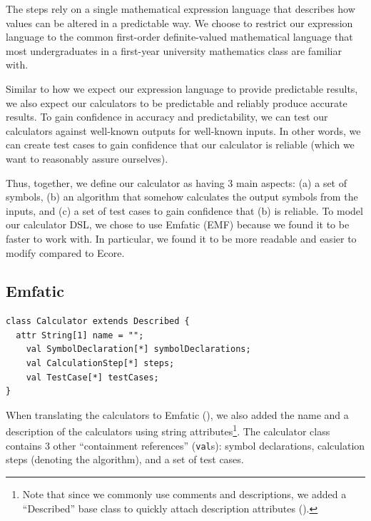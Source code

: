 \documentclass[11pt,fleqn]{article}
\begin{document}
The steps rely on a single mathematical expression language that describes how
values can be altered in a predictable way. We choose to restrict our expression
language to the common first-order definite-valued mathematical language that
most undergraduates in a first-year university mathematics class are familiar
with.

Similar to how we expect our expression language to provide predictable results,
we also expect our calculators to be predictable and reliably produce accurate
results. To gain confidence in accuracy and predictability, we can test our
calculators against well-known outputs for well-known inputs. In other words, we
can create test cases to gain confidence that our calculator is reliable (which
we want to reasonably assure ourselves).

Thus, together, we define our calculator as having 3 main aspects: (a) a set of
symbols, (b) an algorithm that somehow calculates the output symbols from the
inputs, and (c) a set of test cases to gain confidence that (b) is reliable. To
model our calculator DSL, we chose to use Emfatic (EMF) because we found it to
be faster to work with. In particular, we found it to be more readable and
easier to modify compared to Ecore.

\subsection{Emfatic}
\label{sec:modelling:subsec:emfatic}

\begin{lstlisting}[caption={Calculator EMF},label={lst:calculator}]
class Calculator extends Described {
  attr String[1] name = "";
	val SymbolDeclaration[*] symbolDeclarations;
	val CalculationStep[*] steps;
	val TestCase[*] testCases;
}
\end{lstlisting}

When translating the calculators to Emfatic (), we also
added the name and a description of the calculators using string
attributes\footnote{Note that since we commonly use comments and descriptions,
we added a ``Described'' base class to quickly attach description attributes
().}. The calculator class contains 3 other ``containment
references'' (\lstinline{val}s): symbol declarations, calculation steps
(denoting the algorithm), and a set of test cases.
\end{document}

